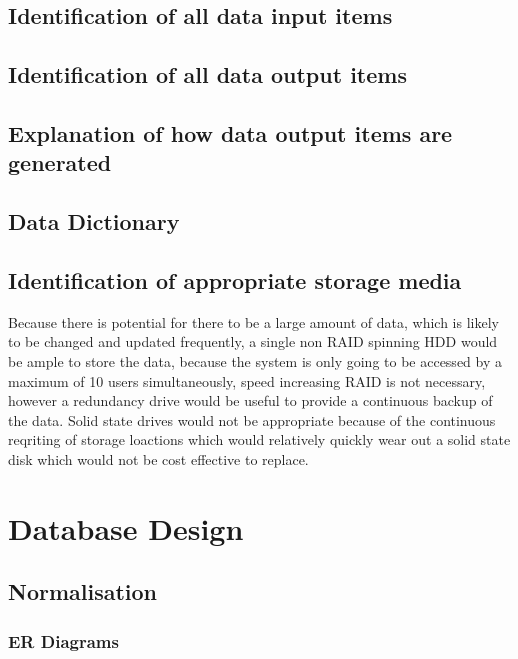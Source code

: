 \subsection{Identification of all data input items}

\subsection{Identification of all data output items}

\subsection{Explanation of how data output items are generated}

\subsection{Data Dictionary}


\subsection{Identification of appropriate storage media}

	Because there is potential for there to be a large amount of data, which is likely to be changed and updated frequently, a single non RAID
	spinning HDD would be ample to store the data, because the system is only going to be accessed by a maximum of 10 users simultaneously, speed
	increasing RAID	is not necessary, however a redundancy drive would be useful to provide a continuous backup of the data. Solid state drives
	would not be appropriate because of the continuous reqriting of storage loactions which  would relatively quickly wear out a solid state disk
	which would not be cost effective to replace.

\section{Database Design}

\subsection{Normalisation}

\subsubsection{ER Diagrams}
	\begin{figure}[H]
	\end{figure}

